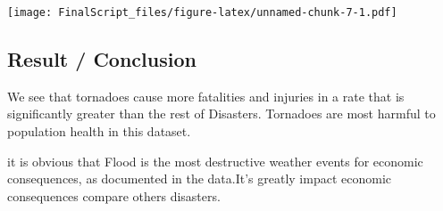 \documentclass[
]{article}
\begin{document}
\texttt{[image: FinalScript\_files/figure-latex/unnamed-chunk-7-1.pdf]}

\hypertarget{result-conclusion}{%
\subsection{Result / Conclusion}\label{result-conclusion}}

We see that tornadoes cause more fatalities and injuries in a rate that
is significantly greater than the rest of Disasters. Tornadoes are most
harmful to population health in this dataset.

it is obvious that Flood is the most destructive weather events for
economic consequences, as documented in the data.It's greatly impact
economic consequences compare others disasters.
\end{document}
